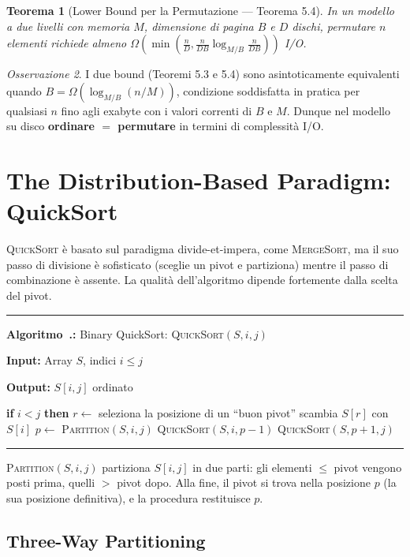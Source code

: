 \documentclass[12pt, a4paper, oneside]{book}
\newcounter{algocf}[chapter]
\renewcommand{\thealgocf}{\thechapter.\arabic{algocf}}
\newenvironment{algorithm}[1][H]{%
  \refstepcounter{algocf}%
  \par\medskip\noindent\rule{\linewidth}{0.4pt}\par\smallskip
}{%
  \par\smallskip\noindent\rule{\linewidth}{0.4pt}\par\medskip
}
\newcommand{\algcaption}[1]{\noindent\textbf{Algoritmo~\thealgocf:} #1\par\smallskip}
\newcommand{\KwIn}[1]{\noindent\textbf{Input:} #1\par}
\newcommand{\KwOut}[1]{\noindent\textbf{Output:} #1\par}
\newcommand{\If}[1]{\noindent\textbf{if} #1 \textbf{then}}
\theoremstyle{plain}
\newtheorem{teorema}{Teorema}[chapter]
\theoremstyle{definition}
\theoremstyle{remark}
\newtheorem{osservazione}[teorema]{Osservazione}
\begin{document}
\begin{teorema}[Lower Bound per la Permutazione --- Teorema 5.4]
In un modello a due livelli con memoria $M$, dimensione di pagina $B$ e $D$ dischi, permutare $n$ elementi richiede almeno $\Omega\!\left(\min\!\left(\frac{n}{D}, \frac{n}{DB}\log_{M/B}\frac{n}{DB}\right)\right)$ I/O.
\end{teorema}

\begin{osservazione}
I due bound (Teoremi 5.3 e 5.4) sono asintoticamente equivalenti quando $B = \Omega(\log_{M/B}(n/M))$, condizione soddisfatta in pratica per qualsiasi $n$ fino agli exabyte con i valori correnti di $B$ e $M$. Dunque nel modello su disco \textbf{ordinare $=$ permutare} in termini di complessità I/O.
\end{osservazione}

\section{The Distribution-Based Paradigm: QuickSort}

\textsc{QuickSort} è basato sul paradigma divide-et-impera, come \textsc{MergeSort}, ma il suo passo di divisione è sofisticato (sceglie un pivot e partiziona) mentre il passo di combinazione è assente. La qualità dell'algoritmo dipende fortemente dalla scelta del pivot.

\begin{algorithm}[H]
\algcaption{Binary QuickSort: \textsc{QuickSort}$(S, i, j)$}
\KwIn{Array $S$, indici $i \le j$}
\KwOut{$S[i,j]$ ordinato}
\If{$i < j$}{
  $r \leftarrow$ seleziona la posizione di un ``buon pivot''\;
  scambia $S[r]$ con $S[i]$\;
  $p \leftarrow$ \textsc{Partition}$(S, i, j)$\;
  \textsc{QuickSort}$(S, i, p-1)$\;
  \textsc{QuickSort}$(S, p+1, j)$\;
}
\end{algorithm}

\textsc{Partition}$(S,i,j)$ partiziona $S[i,j]$ in due parti: gli elementi $\le$ pivot vengono posti prima, quelli $>$ pivot dopo. Alla fine, il pivot si trova nella posizione $p$ (la sua posizione definitiva), e la procedura restituisce $p$.

\subsection{Three-Way Partitioning}
\end{document}
